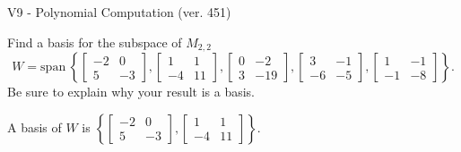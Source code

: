 \begin{exercise}
  \begin{exerciseTitle}V9 - Polynomial Computation (ver. 451)\end{exerciseTitle}
  \begin{exerciseStatement}
    Find a basis for the subspace of \(M_{2,2}\) 
\[W=\mathrm{span}\ \left\{\left[\begin{array}{cc}
-2 & 0 \\
5 & -3
\end{array}\right] , \left[\begin{array}{cc}
1 & 1 \\
-4 & 11
\end{array}\right] , \left[\begin{array}{cc}
0 & -2 \\
3 & -19
\end{array}\right] , \left[\begin{array}{cc}
3 & -1 \\
-6 & -5
\end{array}\right] , \left[\begin{array}{cc}
1 & -1 \\
-1 & -8
\end{array}\right]\right\}.\]
 Be sure to explain why your result is a basis.


  \end{exerciseStatement}
  \begin{exerciseAnswer}
   A basis of \(W\) is  \(\left\{\left[\begin{array}{cc}
-2 & 0 \\
5 & -3
\end{array}\right] , \left[\begin{array}{cc}
1 & 1 \\
-4 & 11
\end{array}\right]\right\}\).
  


  \end{exerciseAnswer}
\end{exercise}